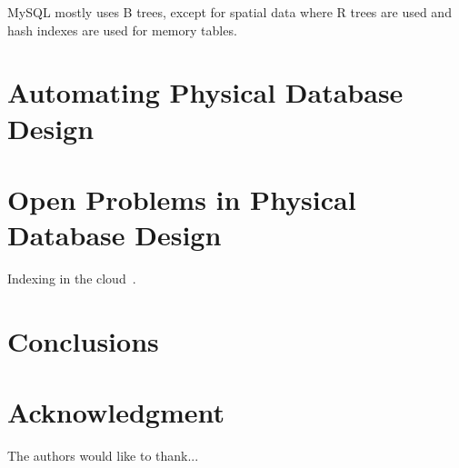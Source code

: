 \documentclass[12pt,a4paper]{article}
\begin{document}
MySQL mostly uses B trees, except for spatial data where R trees are used and hash indexes are used for memory tables.

\section{Automating Physical Database Design}
\label{SEC-AUTO}

\section{Open Problems in Physical Database Design}
\label{SEC-OPEN}

Indexing in the cloud~\cite{wang2010indexing}.

\section{Conclusions}
\label{SEC-CONCL}

\section*{Acknowledgment}


The authors would like to thank...



%








\end{document}
